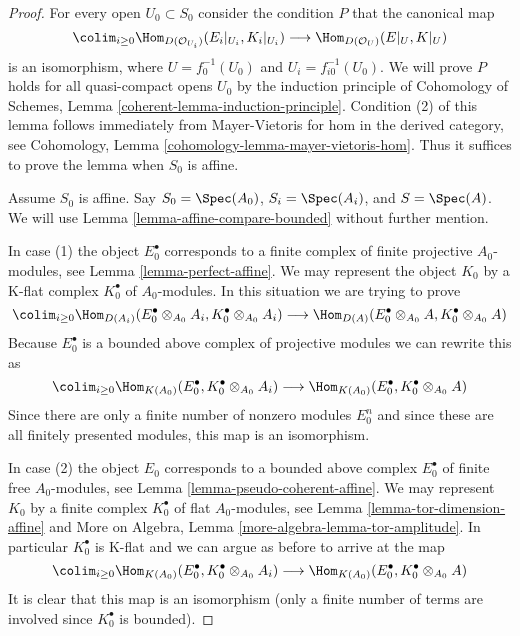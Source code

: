 \begin{proof}
For every open $U_0 \subset S_0$ consider the condition $P$ that the canonical
map
$$
\colim_{i \geq 0} \Hom_{D(\mathcal{O}_{U_i})}(E_i|_{U_i}, K_i|_{U_i})
\longrightarrow
\Hom_{D(\mathcal{O}_U)}(E|_U, K|_U)
$$
is an isomorphism, where $U = f_0^{-1}(U_0)$ and $U_i = f_{i0}^{-1}(U_0)$.
We will prove $P$ holds for all quasi-compact opens $U_0$
by the induction principle of
Cohomology of Schemes, Lemma \ref{coherent-lemma-induction-principle}.
Condition (2) of this lemma follows immediately from Mayer-Vietoris
for hom in the derived category, see
Cohomology, Lemma \ref{cohomology-lemma-mayer-vietoris-hom}.
Thus it suffices to prove the lemma when $S_0$ is affine.

\medskip\noindent
Assume $S_0$ is affine. Say $S_0 = \Spec(A_0)$, $S_i = \Spec(A_i)$, and
$S = \Spec(A)$. We will use Lemma \ref{lemma-affine-compare-bounded}
without further mention.

\medskip\noindent
In case (1) the object $E_0^\bullet$ corresponds to a finite complex
of finite projective $A_0$-modules, see Lemma \ref{lemma-perfect-affine}.
We may represent the object $K_0$ by a K-flat complex $K_0^\bullet$
of $A_0$-modules. In this situation we are trying to prove
$$
\colim_{i \geq 0} \Hom_{D(A_i)}(E_0^\bullet \otimes_{A_0} A_i,
K_0^\bullet \otimes_{A_0} A_i)
\longrightarrow
\Hom_{D(A)}(E_0^\bullet \otimes_{A_0} A, K_0^\bullet \otimes_{A_0} A)
$$
Because $E_0^\bullet$ is a bounded above complex of projective modules
we can rewrite this as
$$
\colim_{i \geq 0} \Hom_{K(A_0)}(E_0^\bullet,
K_0^\bullet \otimes_{A_0} A_i)
\longrightarrow
\Hom_{K(A_0)}(E_0^\bullet, K_0^\bullet \otimes_{A_0} A)
$$
Since there are only a finite number of nonzero modules
$E_0^n$ and since these are all finitely presented modules, this
map is an isomorphism.

\medskip\noindent
In case (2) the object $E_0$ corresponds to a
bounded above complex $E_0^\bullet$ of finite free $A_0$-modules,
see Lemma \ref{lemma-pseudo-coherent-affine}.
We may represent $K_0$ by a finite complex $K_0^\bullet$
of flat $A_0$-modules, see Lemma \ref{lemma-tor-dimension-affine}
and
More on Algebra, Lemma \ref{more-algebra-lemma-tor-amplitude}.
In particular $K_0^\bullet$ is K-flat and we can argue as before
to arrive at the map
$$
\colim_{i \geq 0} \Hom_{K(A_0)}(E_0^\bullet,
K_0^\bullet \otimes_{A_0} A_i)
\longrightarrow
\Hom_{K(A_0)}(E_0^\bullet, K_0^\bullet \otimes_{A_0} A)
$$
It is clear that this map is an isomorphism (only a finite number of
terms are involved since $K_0^\bullet$ is bounded).
\end{proof}


